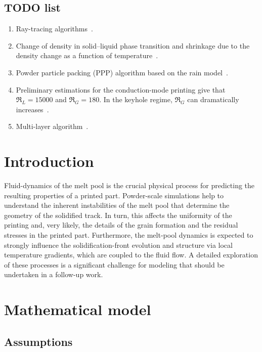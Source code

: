 \documentclass{article}
\begin{document}
\subsection{TODO list}
\begin{enumerate}
    \item Ray-tracing algorithms~\cite{cook2019simulation}.
    \item Change of density in solid--liquid phase transition and shrinkage due to the density change as a function of temperature~\cite{wei2017thermal}.
    \item Powder particle packing (PPP) algorithm based on the rain model~\cite{attar2011simulation}.
    \item Preliminary estimations for the conduction-mode printing give that $\Re_L=15000$
    and $\Re_G=180$. In the keyhole regime, $\Re_G$ can dramatically
    increases~\cite{zhirnov2018evaporation,gusarov2020entrainment,matthews2016denudation}.
    \item Multi-layer algorithm~\cite{attar2011simulation}.
\end{enumerate}

\section{Introduction}

Fluid-dynamics of the melt pool is the crucial physical process
for predicting the resulting properties of a printed part.
Powder-scale simulations help to understand the inherent instabilities of the melt pool
that determine the geometry of the solidified track.
In turn, this affects the uniformity of the printing and, very likely, the details of the grain formation
and the residual stresses in the printed part.
Furthermore, the melt-pool dynamics is expected to strongly influence the solidification-front evolution
and structure via local temperature gradients, which are coupled to the fluid flow.
A detailed exploration of these processes is a significant challenge for modeling
that should be undertaken in a follow-up work.

\section{Mathematical model}

\subsection{Assumptions}
\end{document}
